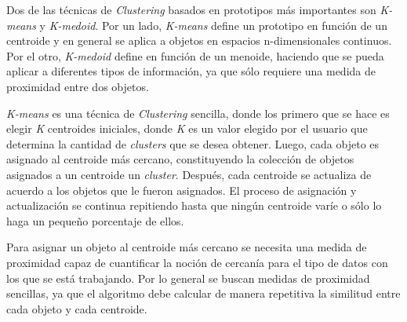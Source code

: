 Dos de las técnicas de \textit{Clustering} basados en prototipos más importantes son \textit{K-means} y \textit{K-medoid}.
Por un lado, \textit{K-means} define un prototipo en función de un centroide y en general se aplica a objetos en
espacios n-dimensionales continuos. Por el otro, \textit{K-medoid} define en función de un menoide, haciendo que se
pueda aplicar a diferentes tipos de información, ya que sólo requiere una medida de proximidad entre dos objetos.

\textit{K-means} es una técnica de \textit{Clustering} sencilla, donde los primero que se hace es elegir \textit{K}
centroides iniciales, donde \textit{K} es un valor elegido por el usuario que determina la cantidad de \textit{clusters}
que se desea obtener. Luego, cada objeto es asignado al centroide más cercano, constituyendo la colección de objetos
asignados a un centroide un \textit{cluster}. Después, cada centroide se actualiza de acuerdo a los objetos que le
fueron asignados. El proceso de asignación y actualización se continua repitiendo hasta que ningún centroide varíe
o sólo lo haga un pequeño porcentaje de ellos.

Para asignar un objeto al centroide más cercano se necesita una medida de proximidad capaz de cuantificar la noción de
cercanía para el tipo de datos con los que se está trabajando. Por lo general se buscan medidas de proximidad sencillas,
ya que el algoritmo debe calcular de manera repetitiva la similitud entre cada objeto y cada centroide.
